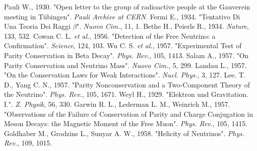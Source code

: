 \documentclass[english]{article}
\begin{document}
\begin{thebibliography}{1}

    Pauli W., 1930. "Open letter to the group of radioactive people at the Gauverein meeting in T\"{u}bingen". \textit{Pauli Archive at CERN}.
    Fermi E., 1934. "Tentativo Di Una Teoria Dei Raggi $\beta$". \textit{Nuovo Cim.}, 11, 1.
    Bethe H., Peierls R., 1934. \textit{Nature}, 133, 532.
    Cowan C. L. \textit{et al.}, 1956. "Detection of the Free Neutrino: a Confirmation". \textit{Science}, 124, 103.
    Wu C. S. \textit{et al.}, 1957. "Experimental Test of Parity Conservation in Beta Decay". \textit{Phys. Rev.}, 105, 1413.
    Salam A., 1957. "On Parity Conservation and Neutrino Mass". \textit{Nuovo Cim.}, 5, 299.
    Landau L., 1957. "On the Conservation Laws for Weak Interactions". \textit{Nucl. Phys.}, 3, 127.
    Lee. T. D., Yang C. N., 1957. "Parity Nonconservation and a Two-Component Theory of the Neutrino". \textit{Phys. Rev.}, 105, 1671.
    Weyl H., 1929. "Elektron und Gravitation. I.". \textit{Z. Physik}, 56, 330.
    Garwin R. L., Lederman L. M., Weinrich M., 1957. "Observations of the Failure of Conservation of Parity and Charge Conjugation in Meson Decays: the Magnetic Moment of the Free Muon". \textit{Phys. Rev.}, 105, 1415.
    Goldhaber M., Grodzins L., Sunyar A. W., 1958. "Helicity of Neutrinos". \textit{Phys. Rev.}, 109, 1015.
    
\end{thebibliography}
\end{document}

